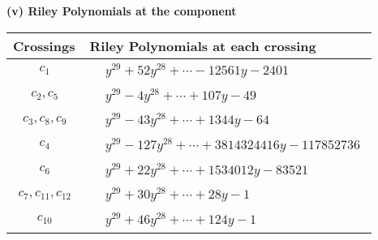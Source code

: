 \documentclass[1p]{elsarticle_modified}
\theoremstyle{definition}
\begin{document}
\flushleft \textbf{(v) Riley Polynomials at the component}\newline \\
\begin{tabular}{m{50pt}|m{274pt}}
Crossings & \hspace{64pt}Riley Polynomials at each crossing \\
\hline $$\begin{aligned}c_{1}\end{aligned}$$&$\begin{aligned}
&y^{29}+52 y^{28}+\cdots-12561 y-2401
\end{aligned}$\\
\hline $$\begin{aligned}c_{2},c_{5}\end{aligned}$$&$\begin{aligned}
&y^{29}-4 y^{28}+\cdots+107 y-49
\end{aligned}$\\
\hline $$\begin{aligned}c_{3},c_{8},c_{9}\end{aligned}$$&$\begin{aligned}
&y^{29}-43 y^{28}+\cdots+1344 y-64
\end{aligned}$\\
\hline $$\begin{aligned}c_{4}\end{aligned}$$&$\begin{aligned}
&y^{29}-127 y^{28}+\cdots+3814324416 y-117852736
\end{aligned}$\\
\hline $$\begin{aligned}c_{6}\end{aligned}$$&$\begin{aligned}
&y^{29}+22 y^{28}+\cdots+1534012 y-83521
\end{aligned}$\\
\hline $$\begin{aligned}c_{7},c_{11},c_{12}\end{aligned}$$&$\begin{aligned}
&y^{29}+30 y^{28}+\cdots+28 y-1
\end{aligned}$\\
\hline $$\begin{aligned}c_{10}\end{aligned}$$&$\begin{aligned}
&y^{29}+46 y^{28}+\cdots+124 y-1
\end{aligned}$\\
\hline
\end{tabular}\\~\\
\end{document}
